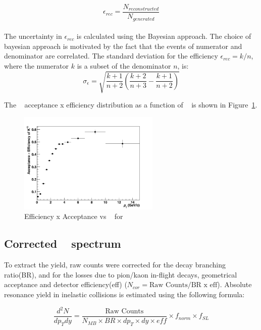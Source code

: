 $$\epsilon_{rec}= \frac{N_{reconstructed}}{N_{generated}}$$
\\
The uncertainty in $\epsilon_{rec}$ is calculated using the Bayesian approach. The choice of bayesian approach is motivated by the fact that the events of numerator and denominator are correlated. The standard deviation for the efficiency $\epsilon_{rec} = k/n$, where the numerator $k$ is a subset of the denominator $n$, is:
$$\sigma_{\epsilon}= \sqrt{\frac{k+1}{n+2} \left( \frac{k+2}{n+3}- \frac{k+1}{n+2}\right)}$$

The \kzero~ acceptance x efficiency distribution as a function of \pT~ is shown in \mbox{Figure \ref{Fig:chap4-4.8}}. 

\begin{figure}[H]
\begin{center}
\includegraphics[width= 0.6\textwidth]{Images/Chapter4/effre.png}
\caption{Efficiency x Acceptance vs \pT~ for \kzero~ }
\label{Fig:chap4-4.8}
\end{center}
\end{figure}


\subsection{Corrected \pT~ spectrum}
\label{par:4.6b}
To extract the yield, raw counts were corrected for the decay branching ratio(BR), and for the losses due to pion/kaon in-flight decays, geometrical acceptance and detector efficiency(eff) ($N_{cor}= \text{Raw Counts}/  \text{BR x eff}$). Absolute resonance yield in inelastic collisions is estimated using the following formula:

$$\frac{d^{2}N}{dp_{T}dy} = \frac{\text{Raw Counts}}{N_{MB} \times BR \times dp_{T} \times dy \times eff} \times f_{norm} \times f_{SL}$$

